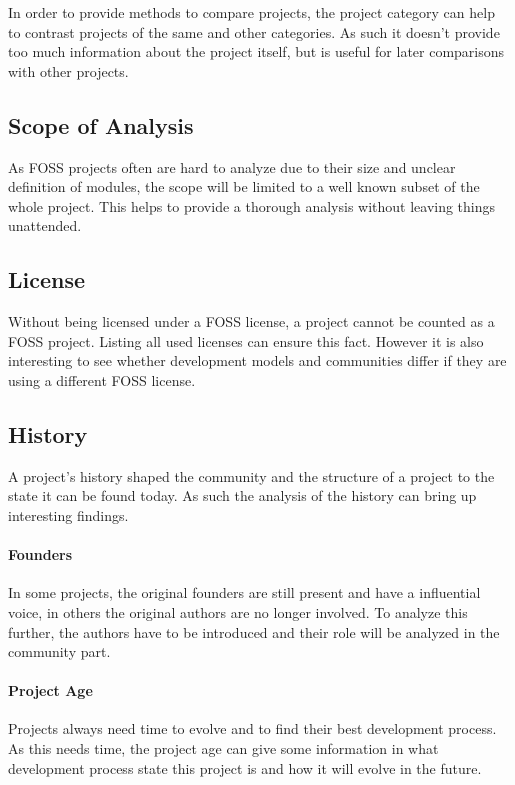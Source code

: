 In order to provide methods to compare projects, the project category can help
to contrast projects of the same and other categories. As such it doesn't
provide too much information about the project itself, but is useful for later
comparisons with other projects.

\subsection{Scope of Analysis}

As \ac{FOSS} projects often are hard to analyze due to their size and unclear
definition of modules, the scope will be limited to a well known subset of the
whole project. This helps to provide a thorough analysis without leaving things
unattended.

\subsection{License}

Without being licensed under a \ac{FOSS} license, a project cannot be counted
as a \ac{FOSS} project. Listing all used licenses can ensure this fact. However
it is also interesting to see whether development models and communities differ
if they are using a different \ac{FOSS} license.

\subsection{History}

A project's history shaped the community and the structure of a project to the
state it can be found today. As such the analysis of the history can bring up
interesting findings.

\paragraph{Founders}

In some projects, the original founders are still present and have a
influential voice, in others the original authors are no longer involved. To
analyze this further, the authors have to be introduced and their role will be
analyzed in the community part.

\paragraph{Project Age}

Projects always need time to evolve and to find their best development process.
As this needs time, the project age can give some information in what
development process state this project is and how it will evolve in the future.

